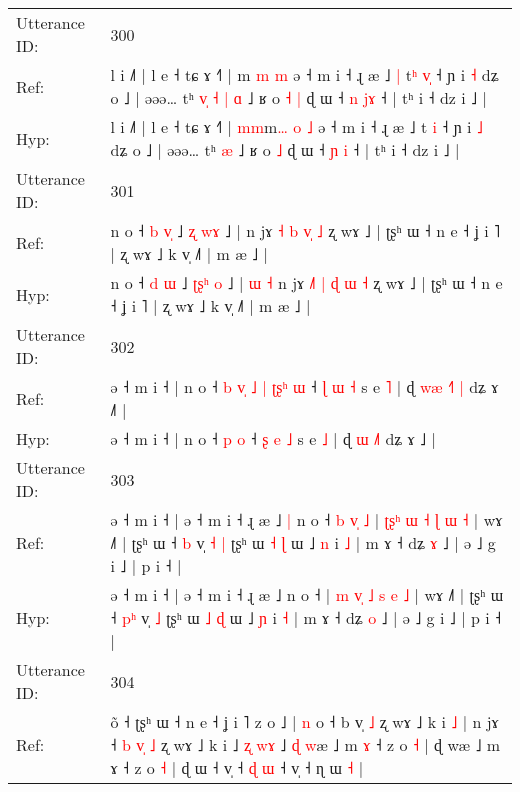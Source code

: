 \documentclass[10pt]{article}
\DeclareRobustCommand{\hl}[1]{{\textcolor{red}{#1}}}
\begin{document}
\begin{longtable}{ll}
\midrule
Utterance ID: & 300 \\
Ref: & l i ˩˥ | l e ˧ tɕ ɤ ˧˥ | \hl{}\hl{}m\hl{} \hl{m} \hl{m} ə ˧ m i ˧ ɻ æ ˩\hl{ }\hl{|} t\hl{ʰ} \hl{v}\hl{̩} ˧ ɲ i \hl{˧} dʑ o ˩ | əəə… tʰ\hl{ }\hl{v}\hl{̩}\hl{ }\hl{˧}\hl{ }\hl{|} \hl{ɑ} ˩ ʁ o\hl{ }\hl{˧} \hl{|} ɖ ɯ ˧ \hl{n} \hl{j}\hl{ɤ} ˧ | tʰ i ˧ dz i ˩ |
 \\
Hyp: & l i ˩˥ | l e ˧ tɕ ɤ ˧˥ | \hl{m}\hl{m}m\hl{…} \hl{o} \hl{˩} ə ˧ m i ˧ ɻ æ ˩\hl{}\hl{} t\hl{} \hl{}\hl{i} ˧ ɲ i \hl{˩} dʑ o ˩ | əəə… tʰ\hl{}\hl{}\hl{}\hl{}\hl{}\hl{}\hl{} \hl{æ} ˩ ʁ o\hl{}\hl{} \hl{˩} ɖ ɯ ˧ \hl{ɲ} \hl{}\hl{i} ˧ | tʰ i ˧ dz i ˩ |
 \\
\midrule
Utterance ID: & 301 \\
Ref: & n o ˧ \hl{b} \hl{v}\hl{̩} ˩ \hl{}\hl{ʐ}\hl{ }\hl{w}\hl{ɤ} ˩ |\hl{}\hl{}\hl{}\hl{} n jɤ \hl{}\hl{˧} \hl{b} \hl{}\hl{v}\hl{̩} \hl{˩} ʐ wɤ ˩ | ʈʂʰ ɯ ˧ n e ˧ ʝ i ˥ | ʐ wɤ ˩ k v̩ ˩˥ | m æ ˩ |
 \\
Hyp: & n o ˧ \hl{d} \hl{}\hl{ɯ} ˩ \hl{ʈ}\hl{ʂ}\hl{ʰ}\hl{ }\hl{o} ˩ |\hl{ }\hl{ɯ}\hl{ }\hl{˧} n jɤ \hl{˩}\hl{˥} \hl{|} \hl{ɖ}\hl{ }\hl{ɯ} \hl{˧} ʐ wɤ ˩ | ʈʂʰ ɯ ˧ n e ˧ ʝ i ˥ | ʐ wɤ ˩ k v̩ ˩˥ | m æ ˩ |
 \\
\midrule
Utterance ID: & 302 \\
Ref: & ə ˧ m i ˧ | n o ˧\hl{ }\hl{b}\hl{ }\hl{v}\hl{̩}\hl{ }\hl{˩}\hl{ }\hl{|} \hl{ʈ}\hl{ʂ}\hl{ʰ} \hl{ɯ} ˧ \hl{ɭ} \hl{ɯ} \hl{˧} s e \hl{˥} | ɖ \hl{w}\hl{æ} \hl{˧}˥\hl{ }\hl{|} dʑ ɤ ˩\hl{˥} |
 \\
Hyp: & ə ˧ m i ˧ | n o ˧\hl{}\hl{}\hl{}\hl{}\hl{}\hl{}\hl{}\hl{}\hl{} \hl{}\hl{}\hl{p} \hl{o} ˧ \hl{ʂ} \hl{e} \hl{˩} s e \hl{˩} | ɖ \hl{}\hl{ɯ} \hl{˩}˥\hl{}\hl{} dʑ ɤ ˩\hl{} |
 \\
\midrule
Utterance ID: & 303 \\
Ref: & ə ˧ m i ˧ | ə ˧ m i ˧ ɻ æ ˩\hl{ }\hl{|} n o ˧\hl{ }\hl{b}\hl{ }\hl{v}\hl{̩}\hl{ }\hl{˩} | \hl{ʈ}\hl{ʂ}\hl{ʰ}\hl{ }\hl{ɯ} \hl{˧} \hl{ɭ} \hl{ɯ} \hl{˧} | wɤ ˩˥ | ʈʂʰ ɯ ˧ \hl{}\hl{b} v̩\hl{ }\hl{˧} \hl{|} ʈʂʰ ɯ \hl{˧} \hl{ɭ} ɯ ˩ \hl{n} i \hl{˩} | m ɤ ˧ dʑ \hl{ɤ} ˩ | ə ˩ g i ˩ | p i ˧ |
 \\
Hyp: & ə ˧ m i ˧ | ə ˧ m i ˧ ɻ æ ˩\hl{}\hl{} n o ˧\hl{}\hl{}\hl{}\hl{}\hl{}\hl{}\hl{} | \hl{}\hl{m}\hl{ }\hl{v}\hl{̩} \hl{˩} \hl{s} \hl{e} \hl{˩} | wɤ ˩˥ | ʈʂʰ ɯ ˧ \hl{p}\hl{ʰ} v̩\hl{}\hl{} \hl{˩} ʈʂʰ ɯ \hl{˩} \hl{ɖ} ɯ ˩ \hl{ɲ} i \hl{˧} | m ɤ ˧ dʑ \hl{o} ˩ | ə ˩ g i ˩ | p i ˧ |
 \\
\midrule
Utterance ID: & 304 \\
Ref: & õ ˧ ʈʂʰ ɯ ˧ n e ˧ ʝ i ˥\hl{}\hl{} z o ˩ | \hl{n} o ˧ b v̩ \hl{˩} ʐ wɤ ˩ k i\hl{ }\hl{˩} | n jɤ ˧\hl{ }\hl{b}\hl{ }\hl{v}\hl{̩}\hl{ }\hl{˩} ʐ wɤ ˩ k i ˩ \hl{ʐ} \hl{w}\hl{ɤ} ˩ \hl{ɖ} \hl{}\hl{w}æ ˩ m \hl{ɤ} ˧ z o \hl{˧} | ɖ wæ ˩ m ɤ ˧ z o \hl{˧} | ɖ ɯ ˧ v̩ ˧ \hl{ɖ}\hl{ }\hl{ɯ} ˧ v̩ ˧ ɳ ɯ \hl{˧} |

\end{longtable}
\end{document}

